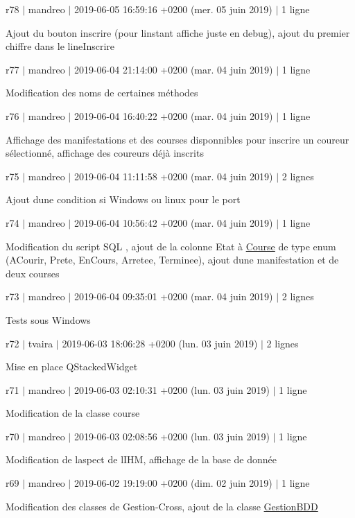 r78 $\vert$ mandreo $\vert$ 2019-\/06-\/05 16\+:59\+:16 +0200 (mer. 05 juin 2019) $\vert$ 1 ligne

Ajout du bouton inscrire (pour l\textquotesingle{}instant affiche juste en debug), ajout du premier chiffre dans le line\+Inscrire

r77 $\vert$ mandreo $\vert$ 2019-\/06-\/04 21\+:14\+:00 +0200 (mar. 04 juin 2019) $\vert$ 1 ligne

Modification des noms de certaines méthodes

r76 $\vert$ mandreo $\vert$ 2019-\/06-\/04 16\+:40\+:22 +0200 (mar. 04 juin 2019) $\vert$ 1 ligne

Affichage des manifestations et des courses disponnibles pour inscrire un coureur sélectionné, affichage des coureurs déjà inscrits

r75 $\vert$ mandreo $\vert$ 2019-\/06-\/04 11\+:11\+:58 +0200 (mar. 04 juin 2019) $\vert$ 2 lignes

Ajout d\textquotesingle{}une condition si Windows ou linux pour le port

r74 $\vert$ mandreo $\vert$ 2019-\/06-\/04 10\+:56\+:42 +0200 (mar. 04 juin 2019) $\vert$ 1 ligne

Modification du script S\+QL , ajout de la colonne Etat à \hyperlink{class_course}{Course} de type enum (A\+Courir, Prete, En\+Cours, Arretee, Terminee), ajout d\textquotesingle{}une manifestation et de deux courses

r73 $\vert$ mandreo $\vert$ 2019-\/06-\/04 09\+:35\+:01 +0200 (mar. 04 juin 2019) $\vert$ 2 lignes

Tests sous Windows

r72 $\vert$ tvaira $\vert$ 2019-\/06-\/03 18\+:06\+:28 +0200 (lun. 03 juin 2019) $\vert$ 2 lignes

Mise en place Q\+Stacked\+Widget

r71 $\vert$ mandreo $\vert$ 2019-\/06-\/03 02\+:10\+:31 +0200 (lun. 03 juin 2019) $\vert$ 1 ligne

Modification de la classe course

r70 $\vert$ mandreo $\vert$ 2019-\/06-\/03 02\+:08\+:56 +0200 (lun. 03 juin 2019) $\vert$ 1 ligne

Modification de l\textquotesingle{}aspect de l\textquotesingle{}I\+HM, affichage de la base de donnée

r69 $\vert$ mandreo $\vert$ 2019-\/06-\/02 19\+:19\+:00 +0200 (dim. 02 juin 2019) $\vert$ 1 ligne

Modification des classes de Gestion-\/\+Cross, ajout de la classe \hyperlink{class_gestion_b_d_d}{Gestion\+B\+DD}

